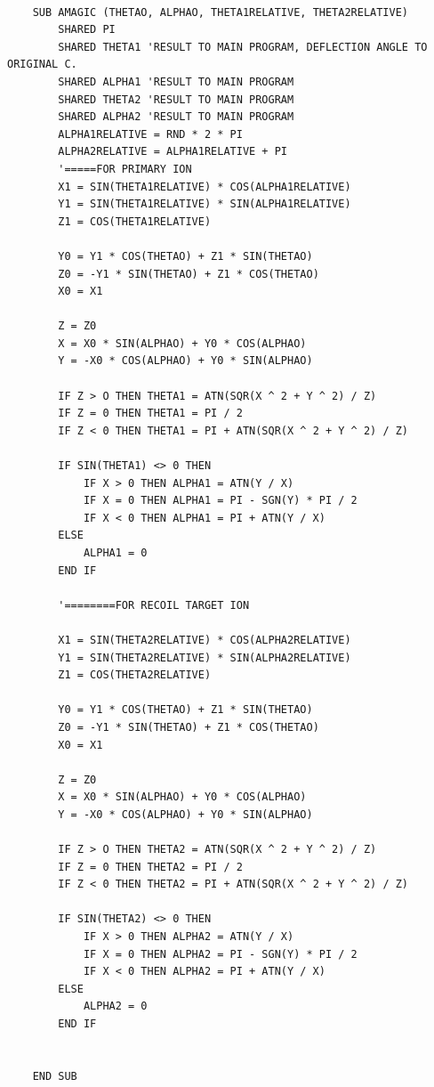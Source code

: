\documentclass[10pt, reqno]{exam}
\begin{document}
\begin{verbatim}
    
    SUB AMAGIC (THETAO, ALPHAO, THETA1RELATIVE, THETA2RELATIVE)
        SHARED PI
        SHARED THETA1 'RESULT TO MAIN PROGRAM, DEFLECTION ANGLE TO ORIGINAL C.
        SHARED ALPHA1 'RESULT TO MAIN PROGRAM
        SHARED THETA2 'RESULT TO MAIN PROGRAM
        SHARED ALPHA2 'RESULT TO MAIN PROGRAM
        ALPHA1RELATIVE = RND * 2 * PI
        ALPHA2RELATIVE = ALPHA1RELATIVE + PI
        '=====FOR PRIMARY ION
        X1 = SIN(THETA1RELATIVE) * COS(ALPHA1RELATIVE)
        Y1 = SIN(THETA1RELATIVE) * SIN(ALPHA1RELATIVE)
        Z1 = COS(THETA1RELATIVE)
    
        Y0 = Y1 * COS(THETAO) + Z1 * SIN(THETAO)
        Z0 = -Y1 * SIN(THETAO) + Z1 * COS(THETAO)
        X0 = X1
    
        Z = Z0
        X = X0 * SIN(ALPHAO) + Y0 * COS(ALPHAO)
        Y = -X0 * COS(ALPHAO) + Y0 * SIN(ALPHAO)
    
        IF Z > O THEN THETA1 = ATN(SQR(X ^ 2 + Y ^ 2) / Z)
        IF Z = 0 THEN THETA1 = PI / 2
        IF Z < 0 THEN THETA1 = PI + ATN(SQR(X ^ 2 + Y ^ 2) / Z)
    
        IF SIN(THETA1) <> 0 THEN
            IF X > 0 THEN ALPHA1 = ATN(Y / X)
            IF X = 0 THEN ALPHA1 = PI - SGN(Y) * PI / 2
            IF X < 0 THEN ALPHA1 = PI + ATN(Y / X)
        ELSE
            ALPHA1 = 0
        END IF
    
        '========FOR RECOIL TARGET ION
    
        X1 = SIN(THETA2RELATIVE) * COS(ALPHA2RELATIVE)
        Y1 = SIN(THETA2RELATIVE) * SIN(ALPHA2RELATIVE)
        Z1 = COS(THETA2RELATIVE)
    
        Y0 = Y1 * COS(THETAO) + Z1 * SIN(THETAO)
        Z0 = -Y1 * SIN(THETAO) + Z1 * COS(THETAO)
        X0 = X1
    
        Z = Z0
        X = X0 * SIN(ALPHAO) + Y0 * COS(ALPHAO)
        Y = -X0 * COS(ALPHAO) + Y0 * SIN(ALPHAO)
    
        IF Z > O THEN THETA2 = ATN(SQR(X ^ 2 + Y ^ 2) / Z)
        IF Z = 0 THEN THETA2 = PI / 2
        IF Z < 0 THEN THETA2 = PI + ATN(SQR(X ^ 2 + Y ^ 2) / Z)
    
        IF SIN(THETA2) <> 0 THEN
            IF X > 0 THEN ALPHA2 = ATN(Y / X)
            IF X = 0 THEN ALPHA2 = PI - SGN(Y) * PI / 2
            IF X < 0 THEN ALPHA2 = PI + ATN(Y / X)
        ELSE
            ALPHA2 = 0
        END IF
    
    
    END SUB
\end{verbatim}
\end{document}
